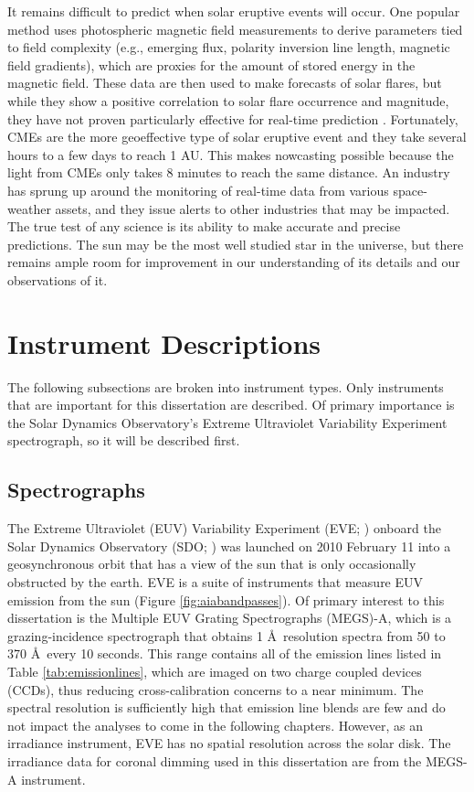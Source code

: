 It remains difficult to predict when solar eruptive events will occur. One popular method uses photospheric magnetic field measurements to derive parameters tied to field complexity (e.g., emerging flux, polarity inversion line length, magnetic field gradients), which are proxies for the amount of stored energy in the magnetic field. These data are then used to make forecasts of solar flares, but while they show a positive correlation to solar flare occurrence and magnitude, they have not proven particularly effective for real-time prediction \citep{Mason2010}. Fortunately, CMEs are the more geoeffective type of solar eruptive event and they take several hours to a few days to reach 1 AU. This makes nowcasting possible because the light from CMEs only takes 8 minutes to reach the same distance. An industry has sprung up around the monitoring of real-time data from various space-weather assets, and they issue alerts to other industries that may be impacted. The true test of any science is its ability to make accurate and precise predictions. The sun may be the most well studied star in the universe, but there remains ample room for improvement in our understanding of its details and our observations of it. 

\section{Instrument Descriptions}
\label{sec:instruments}

The following subsections are broken into instrument types. Only instruments that are important for this dissertation are described. Of primary importance is the Solar Dynamics Observatory's Extreme Ultraviolet Variability Experiment spectrograph, so it will be described first. 

\subsection{Spectrographs}
The Extreme Ultraviolet (EUV) Variability Experiment (EVE; \citealt{Woods2012}) onboard the Solar Dynamics Observatory (SDO; \citealt{Pesnell2012}) was launched on 2010 February 11 into a geosynchronous orbit that has a view of the sun that is only occasionally obstructed by the earth. EVE is a suite of instruments that measure EUV emission from the sun (Figure \ref{fig:aiabandpasses}). Of primary interest to this dissertation is the Multiple EUV Grating Spectrographs (MEGS)-A, which is a grazing-incidence spectrograph that obtains 1 \AA\ resolution spectra from 50 to 370 \AA\ every 10 seconds. This range contains all of the emission lines listed in Table \ref{tab:emissionlines}, which are imaged on two charge coupled devices (CCDs), thus reducing cross-calibration concerns to a near minimum. The spectral resolution is sufficiently high that emission line blends are few and do not impact the analyses to come in the following chapters. However, as an irradiance instrument, EVE has no spatial resolution across the solar disk. The irradiance data for coronal dimming used in this dissertation are from the MEGS-A instrument. 

